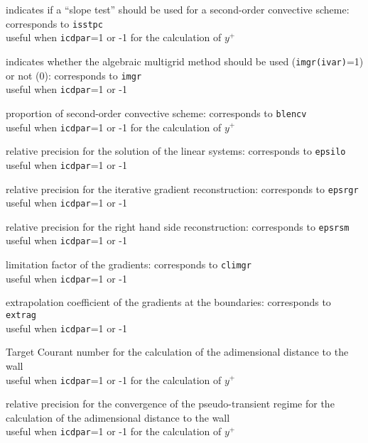 {indicates if a ``slope test'' should be used for a second-order convective
scheme: corresponds to {\tt isstpc}\\
useful when {\tt icdpar}=1 or -1 for the calculation of $y^+$}

{indicates whether the algebraic
multigrid method should be used ({\tt imgr(ivar)}=1) or not (0): corresponds
to {\tt imgr}\\
useful when {\tt icdpar}=1 or -1}

{proportion of second-order convective scheme: corresponds to {\tt blencv}\\
useful when {\tt icdpar}=1 or -1 for the calculation of $y^+$}

{relative precision for the solution of the linear systems:
corresponds to {\tt epsilo}\\
useful when {\tt icdpar}=1 or -1}

{relative precision for the iterative gradient reconstruction:
corresponds to {\tt epsrgr}\\
useful when {\tt icdpar}=1 or -1}

{relative precision for the right hand side reconstruction:
corresponds to {\tt epsrsm}\\
useful when {\tt icdpar}=1 or -1}

{limitation factor of the gradients: corresponds to {\tt climgr}\\
useful when {\tt icdpar}=1 or -1}

{extrapolation coefficient of the gradients at the boundaries:
corresponds to {\tt extrag}\\
useful when {\tt icdpar}=1 or -1}

{Target Courant number for the calculation of the adimensional distance
to the wall\\
useful when {\tt icdpar}=1 or -1 for the calculation of $y^+$}

{relative precision for the convergence of the pseudo-transient regime
for the calculation of the adimensional distance to the wall\\
useful when {\tt icdpar}=1 or -1  for the calculation of $y^+$}

